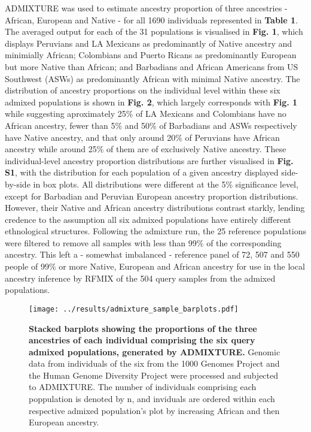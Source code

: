 \documentclass[11pt]{article}
\begin{document}
ADMIXTURE was used to estimate ancestry proportion of three ancestries - African, European and Native - for all 1690 individuals represented in \textbf{Table 1}. The averaged output for each of the 31 populations is visualised in \textbf{Fig. 1}, which displays Peruvians and LA Mexicans as predominantly of Native ancestry and minimially African; Colombians and Puerto Ricans as predominantly European but more Native than African; and Barbadians and African Americans from US Southwest (ASWs) as predominantly African with minimal Native ancestry.
The distribution of ancestry proportions on the individual level within these six admixed populations is shown in \textbf{Fig. 2}, which largely corresponds with \textbf{Fig. 1} while suggesting aproximately 25\% of LA Mexicans and Colombians have no African ancestry, fewer than 5\% and 50\% of Barbadians and ASWs respectively have Native ancestry, and that only around 20\% of Peruvians have African ancestry while around 25\% of them are of exclusively Native ancestry.
These individual-level ancestry proportion distributions are further visualised in \textbf{Fig. S1}, with the distribution for each population of a given ancestry displayed side-by-side in box plots. All distributions were different at the 5\% significance level, except for Barbadian and Peruvian European ancestry proportion distributions. However, their Native and African ancestry distributions contrast starkly, lending credence to the assumption all six admixed populations have entirely different ethnological structures.
Following the admixture run, the 25 reference populations were filtered to remove all samples with less than 99\% of the corresponding ancestry. This left a - somewhat imbalanced - reference panel of 72, 507 and 550 people of 99\% or more Native, European and African ancestry for use in the local ancestry inference by RFMIX of the 504 query samples from the admixed populations. 

















\begin{figure}[htb!]%
    \centering
    \texttt{[image: 
        ../results/admixture\_sample\_barplots.pdf]} 
    \vspace{-.25cm}
    \caption{\textbf{
        Stacked barplots showing the proportions of the three ancestries of each individual comprising the six query admixed populations, generated by ADMIXTURE.
    }
        Genomic data from individuals of the six from the 1000 Genomes Project and the Human Genome Diversity Project were processed and subjected to ADMIXTURE. The number of individuals comprising each poppulation is denoted by n, and inviduals are ordered within each respective admixed population's plot by increasing African and then European ancestry.
    }
\end{figure}
\end{document}
